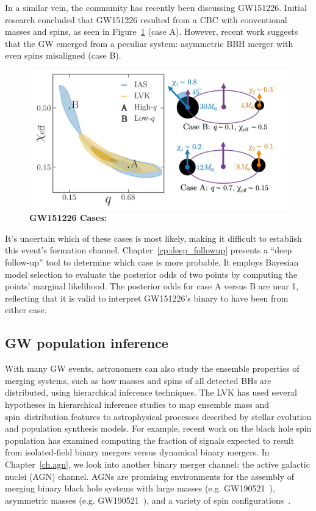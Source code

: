 In a similar vein, the community has recently been discussing GW151226. 
Initial research concluded that GW151226 resulted from a CBC with conventional masses and spins, as seen in Figure~\ref{fig:gw151226_cases} (case A).
However, recent work suggests that the GW emerged from a peculiar system: asymmetric BBH merger with even spins misaligned (case B).

\begin{figure}
\begin{center}
  \centerline{\includegraphics[width=1.1\linewidth]{src/figures/gw151226_cases.png}}
  \caption{\textbf{GW151226 Cases:}  }
  \label{fig:gw151226_cases}
\end{center}
\end{figure}

It's uncertain which of these cases is most likely, making it difficult to establish this event's formation channel.
Chapter~\ref{cp:deep_followup} presents a ``deep follow-up'' tool to determine which case is  more probable.
It employs Bayesian model selection to evaluate the posterior odds of two points by computing the points' marginal likelihood.
The posterior odds for case A versus B are near 1, reflecting that it is valid to interpret GW151226's binary to have been from either case.

\subsection{GW population inference}

With many GW events, astronomers can also study the ensemble properties of merging systems, such as how masses and spins of all detected BHs are distributed, using hierarchical inference techniques.
The LVK has used several hypotheses in hierarchical inference studies to map ensemble mass and spin distribution features to astrophysical processes  described by stellar evolution and population synthesis models.
For example, recent work on the black hole spin population has examined computing the fraction of signals expected to result from isolated-field binary mergers versus dynamical binary mergers.
In Chapter~\ref{ch.agn}, we look into another binary merger channel: the active galactic nuclei (AGN) channel.
AGNs are promising environments for the assembly of merging binary black hole systems with large masses (e.g. GW190521~\cite{gw190521_agn}), asymmetric masses (e.g. GW190521~\cite{gw190425_agn}), and a variety of spin configurations~\cite{agn_spin_population_models}. 

